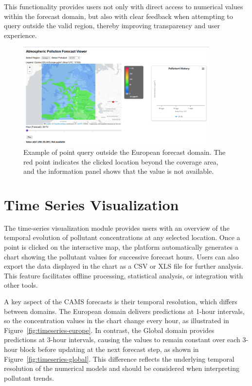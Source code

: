 This functionality provides users not only with direct access to numerical values within the
forecast domain, but also with clear feedback when attempting to query outside the valid
region, thereby improving transparency and user experience.


\begin{figure}[h]
	\centering
	\includegraphics[width=0.9\textwidth]{fig/outofrange.PNG}
	\caption{Example of point query outside the European forecast domain. 
		The red point indicates the clicked location beyond the coverage area, and the information panel shows that the value is not available.}
	
	\label{fig:point-query}
\end{figure}


\section{Time Series Visualization}

The time-series visualization module provides users with an overview of the temporal evolution of pollutant concentrations at any selected location. Once a point is clicked on the interactive map, the platform automatically generates a chart showing the pollutant values for successive forecast hours. Users can also export the data displayed in the chart as a CSV or XLS file for further analysis. This feature facilitates offline processing, statistical analysis, or integration with other tools.

A key aspect of the CAMS forecasts is their temporal resolution, which differs between domains. The European domain delivers predictions at 1-hour intervals, so the concentration values in the chart change every hour, as illustrated in Figure~\ref{fig:timeseries-europe}. In contrast, the Global domain provides predictions at 3-hour intervals, causing the values to remain constant over each 3-hour block before updating at the next forecast step, as shown in Figure~\ref{fig:timeseries-global}. This difference reflects the underlying temporal resolution of the numerical models and should be considered when interpreting pollutant trends.

